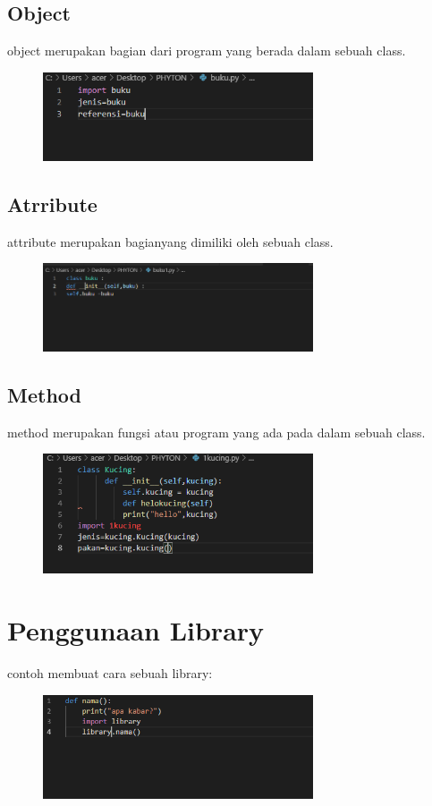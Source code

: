 \documentclass{article}
\begin{document}
\subsection{Object}
object merupakan bagian dari program yang berada dalam sebuah class.
\begin{figure}[h]
\centerline{\includegraphics[width=8cm]{figure/4.PNG}}
\end{figure}
\subsection {Atrribute}
attribute merupakan bagianyang dimiliki oleh sebuah class.
\begin{figure}[h]
\centerline{\includegraphics[width=8cm]{figure/5.PNG}}
\end{figure}
\newpage \subsection {Method}
method merupakan fungsi atau program yang ada pada dalam sebuah class.

\begin{figure}[h]
\centerline{\includegraphics[width=8cm]{figure/6.PNG}}
\end{figure}

\section{Penggunaan Library}
contoh membuat cara sebuah library:
\begin{figure}[h]
\centerline{\includegraphics[width=8cm]{figure/3.PNG}}
\end{figure}
\end{document}

